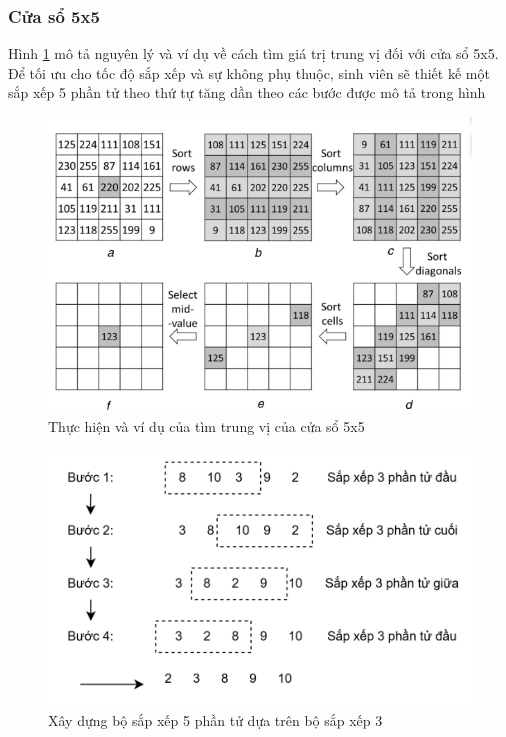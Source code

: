 \subsubsection{Cửa sổ 5x5}

Hình \ref{fig:median5x5Example} mô tả nguyên lý và ví dụ về cách tìm giá trị trung vị đối với cửa sổ 5x5. Để tối ưu cho tốc độ sắp xếp và sự không phụ thuộc, sinh viên sẽ thiết kế một sắp xếp 5 phần tử theo thứ tự tăng dần theo các bước được mô tả trong hình

\begin{figure}[!ht]
	\centering
	\includegraphics[width=0.8\linewidth]{figures/median5x5Example.png}
	\caption{Thực hiện và ví dụ của tìm trung vị của cửa sổ 5x5 \cite{llmf}}
	\label{fig:median5x5Example}
\end{figure}

\begin{figure}[!ht]
	\centering
	\includegraphics[width=0.8\linewidth]{figures/sortAscending5x5Ex.png}
	\caption{Xây dựng bộ sắp xếp 5 phần tử dựa trên bộ sắp xếp 3}
	\label{fig:sortAscending5x5Ex}
\end{figure}

